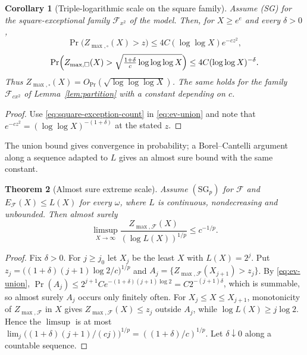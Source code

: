 \documentclass[11pt]{amsart}
\numberwithin{equation}{section}
\theoremstyle{plain}
\newtheorem{theorem}{Theorem}[section]
\newtheorem{corollary}[theorem]{Corollary}
\theoremstyle{definition}
\theoremstyle{remark}
\newcommand{\F}{\mathcal{F}}
\begin{document}
\begin{corollary}[Triple-logarithmic scale on the square family]
\label{cor:ev-square}
Assume (SG) for the square-exceptional family $\F_{x^2}$ of the model. Then,
for $X\ge e^e$ and every $\delta>0$,
\begin{equation}
\label{eq:ev-square}
\Pr\bigl(Z_{\max,\square}(X)>z\bigr)\le4C(\log\log X)e^{-cz^2},
\end{equation}
\begin{equation}
\label{eq:ev-square-b}
\Pr\Bigl(Z_{\max,\square}(X)>\sqrt{\tfrac{1+\delta}{c}\log\log\log X}\Bigr)
\le4C(\log\log X)^{-\delta}.
\end{equation}
Thus $Z_{\max,\square}(X)=O_{\Pr}(\sqrt{\log\log\log X})$. The same holds for
the family $\F_{cx^2}$ of Lemma~\ref{lem:partition} with a constant depending
on $c$.
\end{corollary}

\begin{proof}
Use \eqref{eq:square-exception-count} in \eqref{eq:ev-union} and note that
$e^{-cz^2}=(\log\log X)^{-(1+\delta)}$ at the stated $z$.
\end{proof}

The union bound gives convergence in probability; a Borel--Cantelli argument
along a sequence adapted to $L$ gives an almost sure bound with the same
constant.

\begin{theorem}[Almost sure extreme scale]
\label{thm:ev-as}
Assume $(\mathrm{SG}_p)$ for $\F$ and $E_\F(X)\le L(X)$ for every $\omega$,
where $L$ is continuous, nondecreasing and unbounded. Then almost surely
\[
\limsup_{X\to\infty}\frac{Z_{\max,\F}(X)}{(\log L(X))^{1/p}}\le c^{-1/p}.
\]
\end{theorem}

\begin{proof}
Fix $\delta>0$. For $j\ge j_0$ let $X_j$ be the least $X$ with $L(X)=2^j$.
Put $z_j=\bigl((1+\delta)(j+1)\log2/c\bigr)^{1/p}$ and
$A_j=\{Z_{\max,\F}(X_{j+1})>z_j\}$. By \eqref{eq:ev-union},
$\Pr(A_j)\le2^{j+1}Ce^{-(1+\delta)(j+1)\log2}=C2^{-(j+1)\delta}$, which is
summable, so almost surely $A_j$ occurs only finitely often. For
$X_j\le X\le X_{j+1}$, monotonicity of $Z_{\max,\F}$ in $X$ gives
$Z_{\max,\F}(X)\le z_j$ outside $A_j$, while $\log L(X)\ge j\log2$. Hence
the $\limsup$ is at most
$\lim_j\bigl((1+\delta)(j+1)/(cj)\bigr)^{1/p}=((1+\delta)/c)^{1/p}$. Let
$\delta\downarrow0$ along a countable sequence.
\end{proof}
\end{document}
